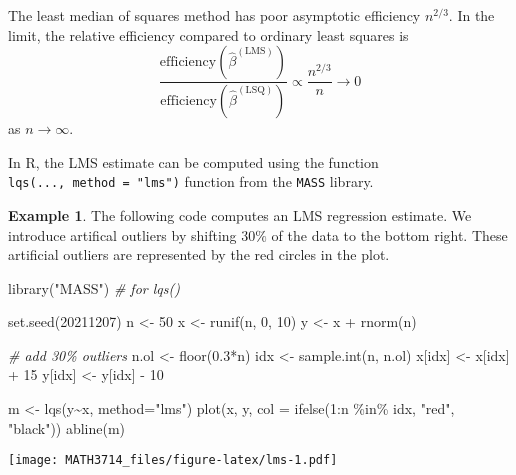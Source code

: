 \documentclass[
  a4paper,
]{article}
\newenvironment{Shaded}{\begin{snugshade}}{\end{snugshade}}
\newcommand{\AttributeTok}[1]{\textcolor[rgb]{0.77,0.63,0.00}{#1}}
\newcommand{\CommentTok}[1]{\textcolor[rgb]{0.56,0.35,0.01}{\textit{#1}}}
\newcommand{\DecValTok}[1]{\textcolor[rgb]{0.00,0.00,0.81}{#1}}
\newcommand{\FloatTok}[1]{\textcolor[rgb]{0.00,0.00,0.81}{#1}}
\newcommand{\FunctionTok}[1]{\textcolor[rgb]{0.00,0.00,0.00}{#1}}
\newcommand{\NormalTok}[1]{#1}
\newcommand{\OtherTok}[1]{\textcolor[rgb]{0.56,0.35,0.01}{#1}}
\newcommand{\SpecialCharTok}[1]{\textcolor[rgb]{0.00,0.00,0.00}{#1}}
\newcommand{\StringTok}[1]{\textcolor[rgb]{0.31,0.60,0.02}{#1}}
\theoremstyle{definition}
\theoremstyle{definition}
\newtheorem{example}{Example}[section]
\theoremstyle{definition}
\theoremstyle{definition}
\theoremstyle{remark}
\begin{document}
The least median of squares method has poor asymptotic efficiency \(n^{2/3}\).
In the limit, the relative efficiency compared to ordinary least squares is
\begin{equation*}
  \frac{\mathrm{efficiency}(\hat\beta^\mathrm{(LMS)})}{\mathrm{efficiency}(\hat\beta^\mathrm{(LSQ)})}
  \propto \frac{n^{2/3}}{n}
  \longrightarrow 0
\end{equation*}
as \(n\to\infty\).

In R, the LMS estimate can be computed using the function
\texttt{lqs(...,\ method\ =\ "lms")} function from the \texttt{MASS} library.

\begin{example}
The following code computes an LMS regression estimate. We
introduce artifical outliers by shifting \(30\%\) of the data
to the bottom right. These artificial outliers are represented
by the red circles in the plot.

\begin{Shaded}
\begin{Highlighting}[]
\FunctionTok{library}\NormalTok{(}\StringTok{"MASS"}\NormalTok{) }\CommentTok{\# for lqs()}

\FunctionTok{set.seed}\NormalTok{(}\DecValTok{20211207}\NormalTok{)}
\NormalTok{n }\OtherTok{\textless{}{-}} \DecValTok{50}
\NormalTok{x }\OtherTok{\textless{}{-}} \FunctionTok{runif}\NormalTok{(n, }\DecValTok{0}\NormalTok{, }\DecValTok{10}\NormalTok{)}
\NormalTok{y }\OtherTok{\textless{}{-}}\NormalTok{ x }\SpecialCharTok{+} \FunctionTok{rnorm}\NormalTok{(n)}

\CommentTok{\# add 30\% outliers}
\NormalTok{n.ol }\OtherTok{\textless{}{-}} \FunctionTok{floor}\NormalTok{(}\FloatTok{0.3}\SpecialCharTok{*}\NormalTok{n)}
\NormalTok{idx }\OtherTok{\textless{}{-}} \FunctionTok{sample.int}\NormalTok{(n, n.ol)}
\NormalTok{x[idx] }\OtherTok{\textless{}{-}}\NormalTok{ x[idx] }\SpecialCharTok{+} \DecValTok{15}
\NormalTok{y[idx] }\OtherTok{\textless{}{-}}\NormalTok{ y[idx] }\SpecialCharTok{{-}} \DecValTok{10}

\NormalTok{m }\OtherTok{\textless{}{-}} \FunctionTok{lqs}\NormalTok{(y}\SpecialCharTok{\textasciitilde{}}\NormalTok{x, }\AttributeTok{method=}\StringTok{"lms"}\NormalTok{)}
\FunctionTok{plot}\NormalTok{(x, y, }\AttributeTok{col =} \FunctionTok{ifelse}\NormalTok{(}\DecValTok{1}\SpecialCharTok{:}\NormalTok{n }\SpecialCharTok{\%in\%}\NormalTok{ idx, }\StringTok{"red"}\NormalTok{, }\StringTok{"black"}\NormalTok{))}
\FunctionTok{abline}\NormalTok{(m)}
\end{Highlighting}
\end{Shaded}

\texttt{[image: MATH3714\_files/figure-latex/lms-1.pdf]}
\end{example}
\end{document}
